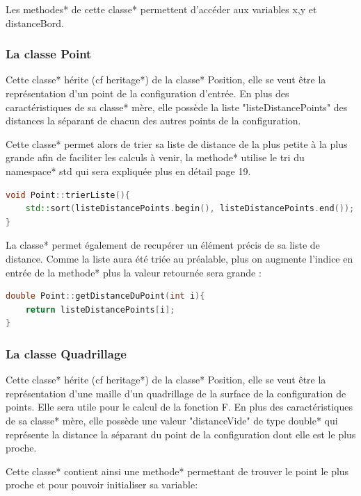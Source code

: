 \documentclass[stage2a]{tnreport}
\begin{document}
Les \gls{methode}s* de cette \gls{classe}* permettent d'accéder aux variables x,y et distanceBord.


\subsubsection{La classe Point}
Cette \gls{classe}* hérite (cf \gls{heritage}*) de la \gls{classe}* Position, elle se veut être la représentation d'un point de la configuration d'entrée. En plus des caractéristiques de sa \gls{classe}* mère, elle possède la liste "listeDistancePoints" des distances la séparant de chacun des autres points de la configuration.

Cette \gls{classe}* permet alors de trier sa liste de distance de la plus petite à la plus grande afin de faciliter les calculs à venir, la \gls{methode}* utilise le tri du \gls{namespace}* std qui sera expliquée plus en détail page 19.
\begin{lstlisting}[language=C++, caption={Méthode triant la liste de distance}, label={lst:triListe}]
void Point::trierListe(){
	std::sort(listeDistancePoints.begin(), listeDistancePoints.end());
}
\end{lstlisting}

La \gls{classe}* permet également de recupérer un élément précis de sa liste de distance. Comme la liste aura été triée au préalable, plus on augmente l'indice en entrée de la \gls{methode}* plus la valeur retournée sera grande :

\begin{lstlisting}[language=C++, caption={Méthode donnant le ième élément de la liste de distances}, label={lst:getDistanceDuPoint}]
double Point::getDistanceDuPoint(int i){
	return listeDistancePoints[i];
}
\end{lstlisting}


\subsubsection{La classe Quadrillage}
Cette \gls{classe}* hérite (cf \gls{heritage}*) de la \gls{classe}* Position, elle se veut être la représentation d'une maille d'un quadrillage de la surface de la configuration de points. Elle sera utile pour le calcul de la fonction F. En plus des caractéristiques de sa \gls{classe}* mère, elle possède une valeur "distanceVide" de type \gls{double}* qui représente la distance la séparant du point de la configuration dont elle est le plus proche.

Cette \gls{classe}* contient ainsi une \gls{methode}* permettant de trouver le point le plus proche et pour pouvoir initialiser sa variable:
\end{document}
